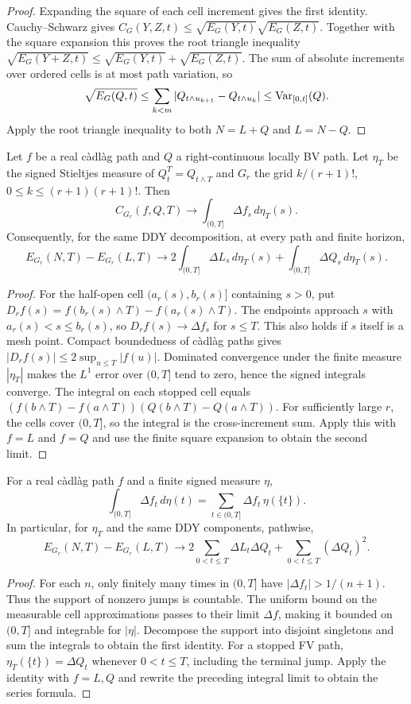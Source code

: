 \begin{proof}
Expanding the square of each cell increment gives the first identity.
Cauchy--Schwarz gives
$C_G(Y,Z,t)\leq\sqrt{E_G(Y,t)}\sqrt{E_G(Z,t)}$.
Together with the square expansion this proves the root triangle inequality
$\sqrt{E_G(Y+Z,t)}\leq\sqrt{E_G(Y,t)}+\sqrt{E_G(Z,t)}$.
The sum of absolute increments over ordered cells is at most path variation,
so
\[
 \sqrt{E_G(Q,t)}\leq\sum_{k<m}|Q_{t\wedge u_{k+1}}-Q_{t\wedge u_k}|
 \leq\operatorname{Var}_{[0,t]}(Q).
\]
Apply the root triangle inequality to both $N=L+Q$ and $L=N-Q$.
\end{proof}
\begin{lemma}
Let $f$ be a real c\`adl\`ag path and $Q$ a right-continuous locally BV path.
Let $\eta_T$ be the signed Stieltjes measure of $Q^T_t=Q_{t\wedge T}$ and
$G_r$ the grid $k/(r+1)!$, $0\leq k\leq(r+1)(r+1)!$. Then
\[
 C_{G_r}(f,Q,T)\longrightarrow\int_{(0,T]}\Delta f_s\,d\eta_T(s).
\]
Consequently, for the same DDY decomposition, at every path and finite horizon,
\[
 E_{G_r}(N,T)-E_{G_r}(L,T)\longrightarrow
 2\int_{(0,T]}\Delta L_s\,d\eta_T(s)+\int_{(0,T]}\Delta Q_s\,d\eta_T(s).
\]
\end{lemma}
\begin{proof}
For the half-open cell $(a_r(s),b_r(s)]$ containing $s>0$, put
$D_rf(s)=f(b_r(s)\wedge T)-f(a_r(s)\wedge T)$.
The endpoints approach $s$ with $a_r(s)<s\leq b_r(s)$, so
$D_rf(s)\to\Delta f_s$ for $s\leq T$. This also holds if $s$ itself is a
mesh point. Compact boundedness of c\`adl\`ag paths gives
$|D_rf(s)|\leq2\sup_{u\leq T}|f(u)|$.
Dominated convergence under the finite measure $|\eta_T|$ makes the
$L^1$ error over $(0,T]$ tend to zero, hence the signed integrals converge.
The integral on each stopped cell equals
$(f(b\wedge T)-f(a\wedge T))(Q(b\wedge T)-Q(a\wedge T))$.
For sufficiently large $r$, the cells cover $(0,T]$, so the integral is
the cross-increment sum. Apply this with $f=L$ and $f=Q$ and use the finite
square expansion to obtain the second limit.
\end{proof}
\begin{lemma}
For a real c\`adl\`ag path $f$ and a finite signed measure $\eta$,
\[
 \int_{(0,T]}\Delta f_t\,d\eta(t)
 =\sum_{t\in(0,T]}\Delta f_t\,\eta(\{t\}).
\]
In particular, for $\eta_T$ and the same DDY components, pathwise,
\[
 E_{G_r}(N,T)-E_{G_r}(L,T)\longrightarrow
 2\sum_{0<t\leq T}\Delta L_t\Delta Q_t+
 \sum_{0<t\leq T}(\Delta Q_t)^2.
\]
\end{lemma}
\begin{proof}
For each $n$, only finitely many times in $(0,T]$ have
$|\Delta f_t|>1/(n+1)$. Thus the support of nonzero jumps is countable.
The uniform bound on the measurable cell approximations passes to their
limit $\Delta f$, making it bounded on $(0,T]$ and integrable for $|\eta|$.
Decompose the support into disjoint singletons and sum the integrals to
obtain the first identity. For a stopped FV path,
$\eta_T(\{t\})=\Delta Q_t$ whenever $0<t\leq T$, including the terminal
jump. Apply the identity with $f=L,Q$ and rewrite the preceding integral
limit to obtain the series formula.
\end{proof}
